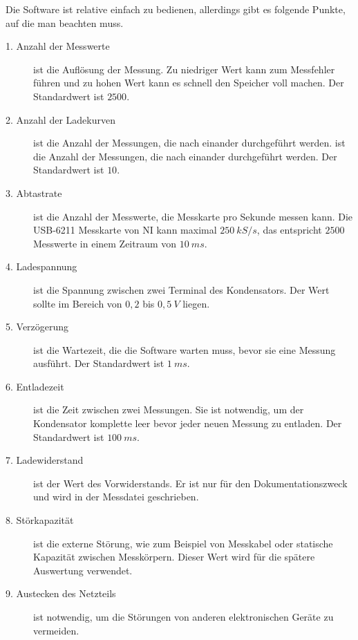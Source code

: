 Die Software ist relative einfach zu bedienen, allerdings gibt es folgende Punkte, auf die man beachten muss.
\begin{description}
    \item[1. Anzahl der Messwerte] ist die Auflösung der Messung.
        Zu niedriger Wert kann zum Messfehler führen und zu hohen Wert kann es schnell den Speicher voll machen.
        Der Standardwert ist $2500$.

    \item[2. Anzahl der Ladekurven] ist die Anzahl der Messungen, die nach einander durchgeführt werden. ist die Anzahl der Messungen, die nach einander durchgeführt werden.
        Der Standardwert ist $10$.

    \item[3. Abtastrate] ist die Anzahl der Messwerte, die Messkarte pro Sekunde messen kann.
        Die USB-6211 Messkarte von NI kann maximal $250 \ kS/s$, das entspricht $2500$ Messwerte in einem Zeitraum von $10 \ ms$.

    \item[4. Ladespannung] ist die Spannung zwischen zwei Terminal des Kondensators.
        Der Wert sollte im Bereich von $0,2$ bis $0,5 \ V$ liegen.

    \item[5. Verzögerung] ist die Wartezeit, die die Software warten muss, bevor sie eine Messung ausführt.
        Der Standardwert ist $1 \ ms$.

    \item[6. Entladezeit] ist die Zeit zwischen zwei Messungen.
        Sie ist notwendig, um der Kondensator komplette leer bevor jeder neuen Messung zu entladen.
        Der Standardwert ist $100 \ ms$.

    \item[7. Ladewiderstand] ist der Wert des Vorwiderstands.
        Er ist nur für den Dokumentationszweck und wird in der Messdatei geschrieben.

    \item[8. Störkapazität] ist die externe Störung, wie zum Beispiel von Messkabel oder statische Kapazität zwischen Messkörpern.
        Dieser Wert wird für die spätere Auswertung verwendet.

    \item[9. Austecken des Netzteils] ist notwendig, um die Störungen von anderen elektronischen Geräte zu vermeiden.
\end{description}

%

